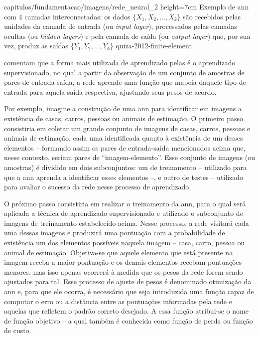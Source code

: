     {capitulos/fundamentacao/imagens/rede_neural_2} %
    {height=7cm} %
    {Exemplo de \acrfull{ann} com 4 camadas interconectadas: os dados \(\{X_1, X_2, \dots, X_k\}\) são recebidos pelas unidades da camada de entrada (ou \textit{input layer}), processados pelas camadas ocultas (ou \textit{hidden layers}) e pela camada de saída (ou \textit{output layer}) que, por sua vez, produz as saídas \(\{Y_1, Y_2, \dots, Y_k\}\)} %
    {quiza-2012-finite-element} %


 comentam que a forma mais utilizada de aprendizado pelas  é o aprendizado supervisionado, no qual a partir da observação de um conjunto de amostras de pares de entrada-saída, a rede aprende uma função que mapeia daquele tipo de entrada para aquela saída respectiva, ajustando seus pesos de acordo.

Por exemplo, imagine a construção de uma \acrshort{ann} para identificar em imagens a existência de casas, carros, pessoas ou animais de estimação. O primeiro passo consistiria em coletar um grande conjunto de imagens de casas, carros, pessoas e animais de estimação, cada uma identificada quanto à existência de um desses elementos -- formando assim os pares de entrada-saída mencionados acima que, nesse contexto, seriam pares de ``imagem-elemento''.
Esse conjunto de imagens (ou amostras) é dividido em dois subconjuntos: um de treinamento -- utilizado para que a \acrshort{ann} aprenda a identificar esses elementos --, e outro de testes -- utilizado para avaliar o sucesso da rede nesse processo de aprendizado.

O próximo passo consistiria em realizar o treinamento da \acrshort{ann}, para o qual será aplicada a técnica de aprendizado supervisionado e utilizado o subconjunto de imagens de treinamento estabelecido acima.
Nesse processo, a rede visitará cada uma dessas imagens e produzirá uma pontuação com a probabilidade de existência um dos elementos possíveis naquela imagem -- casa, carro, pessoa ou animal de estimação.
Objetiva-se que aquele elemento que está presente na imagem receba a maior pontuação e os demais elementos recebam pontuações menores, mas isso apenas ocorrerá à medida que os pesos da rede forem sendo ajustados para tal.
Esse processo de ajuste de pesos é denominado otimização da \acrshort{ann} e, para que ele ocorra, é necessário que seja introduzida uma função capaz de computar o erro ou a distância entre as pontuações informadas pela rede e aquelas que refletem o padrão correto desejado.
A essa função atribui-se o nome de função objetivo -- a qual também é conhecida como função de perda ou função de custo.


